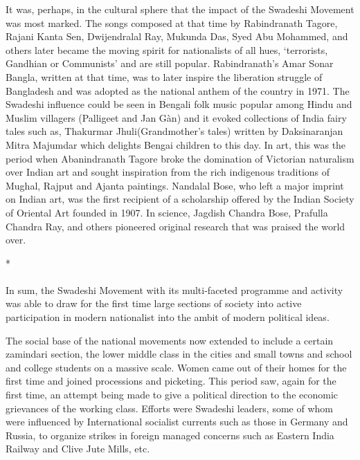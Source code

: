 It was, perhaps, in the cultural sphere that the impact of the Swadeshi Movement was most marked. The songs composed at that time by Rabindranath Tagore, Rajani Kanta Sen, Dwijendralal Ray, Mukunda Das, Syed Abu Mohammed, and others later became the moving spirit for nationalists of all hues, `terrorists, Gandhian or Communists' and are still popular. Rabindranath's Amar Sonar Bangla, written at that time, was to later inspire the liberation struggle of Bangladesh and was adopted as the national anthem of the country in 1971. The Swadeshi influence could be seen in Bengali folk music popular among Hindu and Muslim villagers (Palligeet and Jan Gàn) and it evoked collections of India fairy tales such as, Thakurmar Jhuli(Grandmother's tales) written by Daksinaranjan Mitra Majumdar which delights Bengai children to this day. In art, this was the period when Abanindranath Tagore broke the domination of Victorian naturalism over Indian art and sought inspiration from the rich indigenous traditions of Mughal, Rajput and Ajanta paintings. Nandalal Bose, who left a major imprint on Indian art, was the first recipient of a scholarship offered by the Indian Society of Oriental Art founded in 1907. In science, Jagdish Chandra Bose, Prafulla Chandra Ray, and others pioneered original research that was praised the world over.

\begin{center}*\end{center}

\paragraph*{}


In sum, the Swadeshi Movement with its multi-faceted programme and activity was able to draw for the first time large sections of society into active participation in modern nationalist into the ambit of modern political ideas.

The social base of the national movements now extended to include a certain zamindari section, the lower middle class in the cities and small towns and school and college students on a massive scale. Women came out of their homes for the first time and joined processions and picketing. This period saw, again for the first time, an attempt being made to give a political direction to the economic grievances of the working class. Efforts were Swadeshi leaders, some of whom were influenced by International socialist currents such as those in Germany and Russia, to organize strikes in foreign managed concerns such as Eastern India Railway and Clive Jute Mills, etc.

